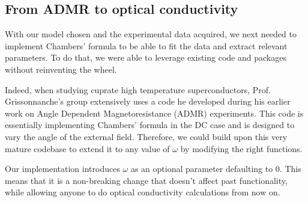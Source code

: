 \subsection{From ADMR to optical conductivity}
With our model chosen and the experimental data acquired, 
we next needed to implement Chambers' formula to be able to fit the data and extract relevant parameters. 
To do that, we were able to leverage existing code and packages without reinventing the wheel.

Indeed, when studying cuprate high temperature superconductors, 
Prof. Grissonnanche's group extensively uses a code he developed during his earlier work on Angle Dependent Magnetoresistance (ADMR) experiments. 
This code is essentially implementing Chambers' formula in the DC case and is designed to vary the angle of the external field. 
Therefore, we could build upon this very mature codebase to extend it to any value of $\omega$ by modifying the right functions.

Our implementation introduces $\omega$ as an optional parameter defaulting to $0$. 
This means that it is a non-breaking change that doesn't affect past functionality, 
while allowing anyone to do optical conductivity calculations from now on.
